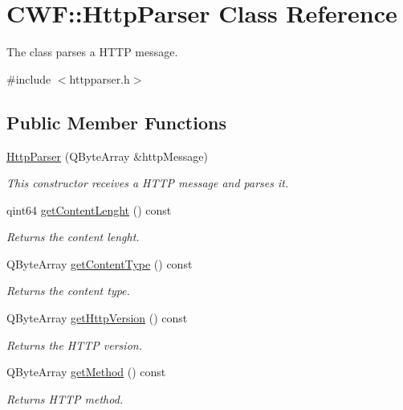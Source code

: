 \hypertarget{class_c_w_f_1_1_http_parser}{\section{C\+W\+F\+:\+:Http\+Parser Class Reference}
\label{class_c_w_f_1_1_http_parser}
}


The class parses a H\+T\+T\+P message.  




{\ttfamily \#include $<$httpparser.\+h$>$}

\subsection*{Public Member Functions}
\begin{DoxyCompactItemize}
\item 
\hyperlink{class_c_w_f_1_1_http_parser_a622e35e9c7de9a29cfe3a2cf63eccef0}{Http\+Parser} (Q\+Byte\+Array \&http\+Message)
\begin{DoxyCompactList}\small\item\em This constructor receives a H\+T\+T\+P message and parses it. \end{DoxyCompactList}\item 
qint64 \hyperlink{class_c_w_f_1_1_http_parser_af6b66138a1afe71e15640d4108d426fc}{get\+Content\+Lenght} () const 
\begin{DoxyCompactList}\small\item\em Returns the content lenght. \end{DoxyCompactList}\item 
Q\+Byte\+Array \hyperlink{class_c_w_f_1_1_http_parser_ae25e55945b9b364a20c9f5d3a8696f15}{get\+Content\+Type} () const 
\begin{DoxyCompactList}\small\item\em Returns the content type. \end{DoxyCompactList}\item 
Q\+Byte\+Array \hyperlink{class_c_w_f_1_1_http_parser_af8ceae98ad9e63dd30c56409438f4131}{get\+Http\+Version} () const 
\begin{DoxyCompactList}\small\item\em Returns the H\+T\+T\+P version. \end{DoxyCompactList}\item 
Q\+Byte\+Array \hyperlink{class_c_w_f_1_1_http_parser_aef9dffb5672f9db22cf2a590dc641706}{get\+Method} () const 
\begin{DoxyCompactList}\small\item\em Returns H\+T\+T\+P method. \end{DoxyCompactList}\item 

\end{DoxyCompactItemize}
